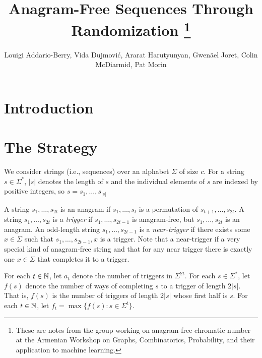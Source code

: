\documentclass{patmorin}
\title{Anagram-Free Sequences Through Randomization%
   \thanks{These are notes from the group working on anagram-free chromatic number at the Armenian Workshop on Graphs, Combinatorics, Probability,
   and their application to machine learning.}}
\author{Louigi Addario-Berry, Vida Dujmović, Ararat Harutyunyan, Gwenäel Joret, Colin McDiarmid, Pat Morin}
\begin{document}
\maketitle
%
\begin{abstract}
\end{abstract}
%
%


\section{Introduction}









\section{The Strategy}

We consider strings (i.e., sequences) over an alphabet $\Sigma$ of size $c$.  For a string $s\in\Sigma^*$, $|s|$ denotes the length of $s$ and the individual elements of $s$ are indexed by positive integers, so $s=s_1,\ldots,s_{|s|}$

A string $s_1,\ldots,s_{2t}$ is an anagram if $s_1,\ldots,s_t$ is a permutation of $s_{t+1},\ldots,s_{2t}$.  A string $s_1,\ldots,s_{2t}$ is a \emph{trigger} if $s_1,\ldots,s_{2t-1}$ is anagram-free, but $s_1,\ldots,s_{2t}$ is an anagram.    An odd-length string $s_1,\ldots,s_{2t-1}$ is a \emph{near-trigger} if there exists some $x\in\Sigma$ such that $s_1,\ldots,s_{2t-1},x$ is a trigger. Note that a near-trigger if a very special kind of anagram-free string and that for any near trigger there is exactly one $x\in\Sigma$ that completes it to a trigger.

For each $t\in\mathbb{N}$, let $a_t$ denote the number of triggers in $\Sigma^{2t}$.
For each $s\in\Sigma^*$, let $f(s)$ denote the number of ways of completing $s$ to a trigger of length $2|s|$.  That is, $f(s)$ is the number of triggers of length $2|s|$ whose first half is $s$.  For each $t\in\mathbb{N}$, let $f_t = \max\{f(s):s\in\Sigma^t\}$.
\end{document}
